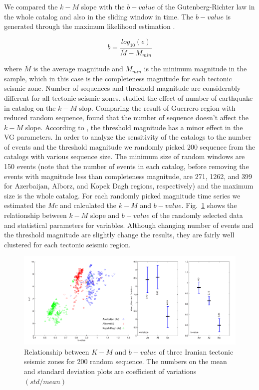 \noindent
We compared the $k-M$ slope with the $b-value$ of the Gutenberg-Richter law in the whole catalog and also in the sliding window in time. The $b-value$ is generated through the maximum likelihood estimation \citep{Aki1965}.

\begin{equation}
b = \frac{log_{10}(e) }{\overline{M} - M_{min}}  
\end{equation}
 
 \noindent
 where $\overline{M}$ is the average magnitude and $M_{min}$ is the minimum magnitude in the sample, which in this case is the completeness magnitude for each tectonic seismic zone. Number of sequences and threshold magnitude are considerably different for all tectonic seismic zones. \citet{Telesca2013} studied the effect of number of earthquake in catalog on the $k-M$ slop. Comparing the result of Guerrero region with reduced random sequence, \citet{Telesca2013} found that the number of sequence doesn't affect the $k-M$ slope.  According to \citet{Telesca2012}, the threshold magnitude has a minor effect in the VG parameters. In order to analyze the sensitivity of the catalogs to the number of events and the threshold magnitude we randomly picked 200 sequence from the catalogs with various sequence size. The minimum size of random windows are 150 events (note that the number of events in each catalog, before removing the events with magnitude less than completeness magnitude, are 271, 1262, and 399 for Azerbaijan, Alborz, and Kopek Dagh regions, respectively) and the maximum size is the whole catalog. For each randomly picked magnitude time series we estimated the $Mc$ and calculated the $k-M$ and $b-value$. Fig.~\ref{fig:random} shows the relationship between $k-M$ slope and $b-value$ of the randomly selected data and statistical parameters for variables. Although changing number of events and the threshold magnitude are slightly change the results, they are fairly well clustered for each tectonic seismic region. 
 
 \begin{figure} [ht]
\centering
\includegraphics[scale=0.4]{figures/pdf/Figure06.pdf} 
\caption{ Relationship between $K-M$ and $b-value$ of three Iranian tectonic seismic zones for 200 random sequence. The numbers on the mean and standard deviation plots are coefficient of variations $(std/mean)$}
\label{fig:random}
\end{figure}
 
